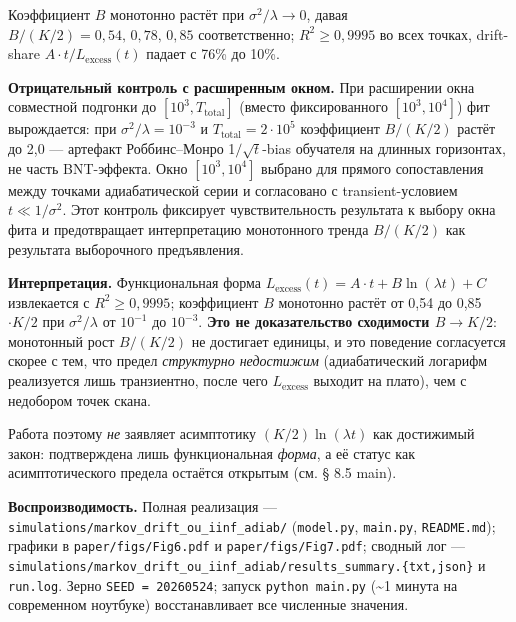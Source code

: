 \documentclass[pdflatex,sn-mathphys-ay]{sn-jnl}
\begin{document}
Коэффициент \(B\) монотонно растёт при \(\sigma^2/\lambda \to 0\), давая \(B/(K/2) = 0{,}54,\, 0{,}78,\, 0{,}85\) соответственно; \(R^2 \ge 0{,}9995\) во всех точках, drift-share \(A \cdot t / L_{\text{excess}}(t)\) падает с 76\% до 10\%.



\textbf{Отрицательный контроль с расширенным окном.} При расширении окна совместной подгонки до \([10^3, T_{\text{total}}]\) (вместо фиксированного \([10^3, 10^4]\)) фит вырождается: при \(\sigma^2/\lambda = 10^{-3}\) и \(T_{\text{total}} = 2\cdot 10^5\) коэффициент \(B/(K/2)\) растёт до 2,0 --- артефакт Роббинс--Монро 1\(/\sqrt t\)-bias обучателя на длинных горизонтах, не часть BNT-эффекта. Окно \([10^3, 10^4]\) выбрано для прямого сопоставления между точками адиабатической серии и согласовано с transient-условием \(t \ll 1/\sigma^2\). Этот контроль фиксирует чувствительность результата к выбору окна фита и предотвращает интерпретацию монотонного тренда \(B/(K/2)\) как результата выборочного предъявления.



\textbf{Интерпретация.} Функциональная форма \(L_{\text{excess}}(t) = A\cdot t + B\ln(\lambda t) + C\) извлекается с \(R^2 \ge 0{,}9995\); коэффициент \(B\) монотонно растёт от 0,54 до 0,85 \(\cdot K/2\) при \(\sigma^2/\lambda\) от \(10^{-1}\) до \(10^{-3}\). \textbf{Это не доказательство сходимости \(B \to K/2\)}: монотонный рост \(B/(K/2)\) не достигает единицы, и это поведение согласуется скорее с тем, что предел \emph{структурно недостижим} (адиабатический логарифм реализуется лишь транзиентно, после чего \(L_{\text{excess}}\) выходит на плато), чем с недобором точек скана.



Работа поэтому \emph{не} заявляет асимптотику \((K/2)\ln(\lambda t)\) как достижимый закон: подтверждена лишь функциональная \emph{форма}, а её статус как асимптотического предела остаётся открытым (см. § 8.5 main).



\textbf{Воспроизводимость.} Полная реализация --- \texttt{simulations/markov\_drift\_ou\_iinf\_adiab/} (\texttt{model.py}, \texttt{main.py}, \texttt{README.md}); графики в \texttt{paper/figs/Fig6.pdf} и \texttt{paper/figs/Fig7.pdf}; сводный лог --- \texttt{simulations/markov\_drift\_ou\_iinf\_adiab/results\_summary.\{txt,json\}} и \texttt{run.log}. Зерно \texttt{SEED\ =\ 20260524}; запуск \texttt{python\ main.py} (\textasciitilde1 минута на современном ноутбуке) восстанавливает все численные значения.
\end{document}
